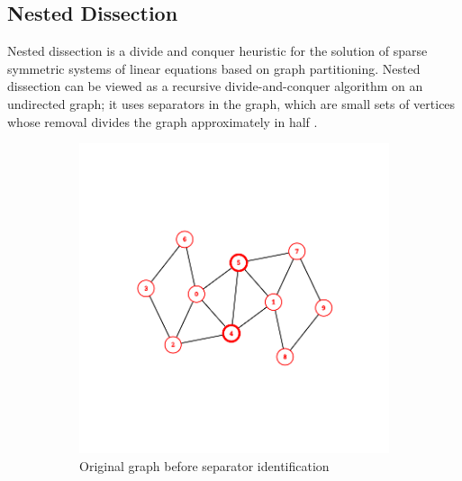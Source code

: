 \subsection{Nested Dissection}

Nested dissection is a divide and conquer heuristic for the solution of sparse symmetric systems of linear equations based on graph partitioning. Nested dissection can be viewed as a recursive divide-and-conquer algorithm on an undirected graph; it uses separators in the graph, which are small sets of vertices whose removal divides the graph approximately in half  \cite{lipton_generalized_1979}.

\begin{figure}[htbp]
    \centering
    \begin{subfigure}[b]{0.45\textwidth}
        \centering
        \includegraphics[width=\textwidth]{fig/background/nd-1.png}
        \caption{Original graph before separator identification}
        \label{fig:nd-original}
    \end{subfigure}
    \hfill
    \begin{subfigure}[b]{0.45\textwidth}
        \centering

\end{subfigure}
\end{figure}
